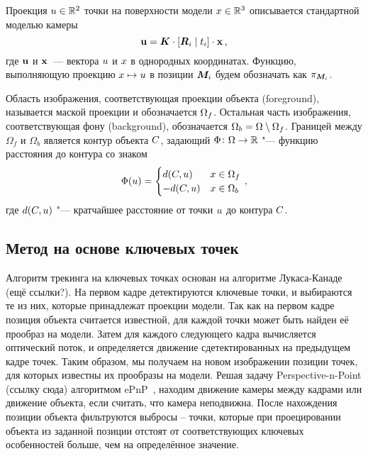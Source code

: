 Проекция $\mathnormal{u} \in \mathbb{R}^2$ точки на поверхности модели
$\mathnormal{x} \in \mathbb{R}^3$ описывается стандартной моделью камеры
\begin{equation}\label{eqn:proj}
    \mathbf{u} = \bm{K} \cdot [\bm{R}_i \mid \mathnormal{t}_i] \cdot \mathbf{x}
    \,\text{,}
\end{equation}
где $\mathbf{u}$ и $\mathbf{x}$~--- вектора $\mathnormal{u}$ и $\mathnormal{x}$ в однородных
координатах. Функцию, выполняющую проекцию $\mathnormal{x} \mapsto \mathnormal{u}$ в
позиции $\bm{M}_i$ будем обозначать как $\pi_{\bm{M}_i}$.

Область изображения, соответствующая проекции объекта (foreground), называется
маской проекции и обозначается $\Omega_f$.
Остальная часть изображения, соответствующая фону (background), обозначается
$\Omega_b = \Omega \setminus \Omega_f$.
Границей между $\Omega_f$ и $\Omega_b$ является контур объекта $C$,
задающий
$\Phi \colon \Omega \to \mathbb{R}$ "---
функцию расстояния до контура со знаком
\begin{equation*}
    \Phi(\mathnormal{u}) =
    \begin{cases}
        d(C, \mathnormal{u})  & x \in \Omega_f \\
        -d(C, \mathnormal{u})  & x \in \Omega_b
    \end{cases}
    \,\text{,}
\end{equation*}
где $d(C, \mathnormal{u})$ "--- кратчайшее расстояние от точки $\mathnormal{u}$
до контура $C$.

\subsection{Метод на основе ключевых точек}


Алгоритм трекинга на ключевых точках основан на алгоритме
Лукаса-Канаде~\cite{LukasKanade} (ещё ссылки?).
На первом кадре детектируются ключевые точки, и выбираются те из них, которые
принадлежат проекции модели.
Так как на первом кадре позиция объекта считается известной, для каждой точки
может быть найден её прообраз на модели.
Затем для каждого следующего кадра вычисляется оптический поток, и определяется
движение сдетектированных на предыдущем кадре точек.
Таким образом, мы получаем на новом изображении позиции точек, для которых
известны их прообразы на модели.
Решая задачу Perspective-n-Point (ссылку сюда) алгоритмом ePnP~\cite{Lepetit},
находим движение камеры между кадрами или движение объекта, если считать, что
камера неподвижна.
После нахождения позиции объекта фильтруются выбросы -- точки,
которые при проецировании объекта из заданной позиции отстоят от
соответствующих ключевых особенностей больше, чем на определённое значение.

